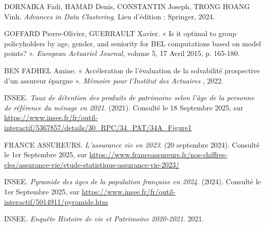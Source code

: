 \newpage %


\begin{thebibliography}{9}



DORNAIKA Fadi, HAMAD Denis, CONSTANTIN Joseph, TRONG HOANG Vinh. \textit{Advances in Data Clustering}. Lieu d'édition : Springer, 2024.

GOFFARD Pierre-Olivier, GUERRAULT Xavier. « Is it optimal to group policyholders by age, gender, and seniority for BEL computations based on model points? ». \textit{European Actuariel Journal}, volume 5, 17 Avril 2015, p. 165-180.


BEN FADHEL Amine. « Accéleration de l'évaluation de la solvabilité prospective d'un assureur épargne ». \textit{Mémoire pour l'Institut des Actuaires }, 2022.

INSEE. \textit{Taux de détention des produits de patrimoine selon l'âge de la personne de référence du ménage en 2021}. (2021). Consulté le 18 Septembre 2025, sur \url{https://www.insee.fr/fr/outil-interactif/5367857/details/30_RPC/34_PAT/34A_Figure1}


FRANCE ASSUREURS. \textit{L'assurance vie en 2023}. (20 septembre 2024). Consulté le 1er Septembre 2025, sur \url{https://www.franceassureurs.fr/nos-chiffres-cles/assurance-vie/etude-statistique-assurance-vie-2023/}

INSEE. \textit{Pyramide des âges de la population française en 2024}. (2024). Consulté le 1er Septembre 2025, sur \url{https://www.insee.fr/fr/outil-interactif/5014911/pyramide.htm}

INSEE. \textit{Enquête Histoire de vie et Patrimoine 2020-2021}. 2021.

\end{thebibliography}